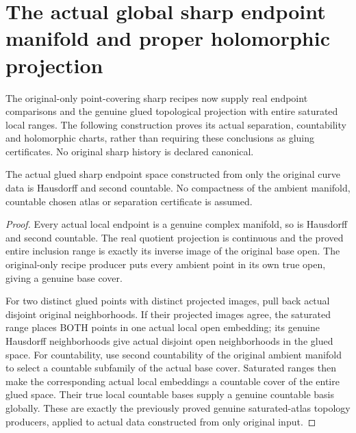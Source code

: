 \section{The actual global sharp endpoint manifold and proper holomorphic projection}

The original-only point-covering sharp recipes now supply real endpoint
comparisons and the genuine glued topological projection with entire saturated
local ranges. The following construction proves its actual separation,
countability and holomorphic charts, rather than requiring these conclusions
as gluing certificates. No original sharp history is declared canonical.

\begin{theorem}
\label{hir:sharp-actual-original-glued-endpoint-separation-countability}
\leanok
{}
The actual glued sharp endpoint space constructed from only the original
curve data is Hausdorff and second countable. No compactness of the ambient
manifold, countable chosen atlas or separation certificate is assumed.
\end{theorem}
\begin{proof}
Every actual local endpoint is a genuine complex manifold, so is Hausdorff
and second countable. The real quotient projection is continuous and the
proved entire inclusion range is exactly its inverse image of the original
base open. The original-only recipe producer puts every ambient point in its
own true open, giving a genuine base cover.

For two distinct glued points with distinct projected images, pull back
actual disjoint original neighborhoods. If their projected images agree,
the saturated range places BOTH points in one actual local open embedding;
its genuine Hausdorff neighborhoods give actual disjoint open neighborhoods
in the glued space. For countability, use second countability of the original
ambient manifold to select a countable subfamily of the actual base cover.
Saturated ranges then make the corresponding actual local embeddings a
countable cover of the entire glued space. Their true local countable bases
supply a genuine countable basis globally. These are exactly the previously
proved genuine saturated-atlas topology producers, applied to actual data
constructed from only original input.
\end{proof}

